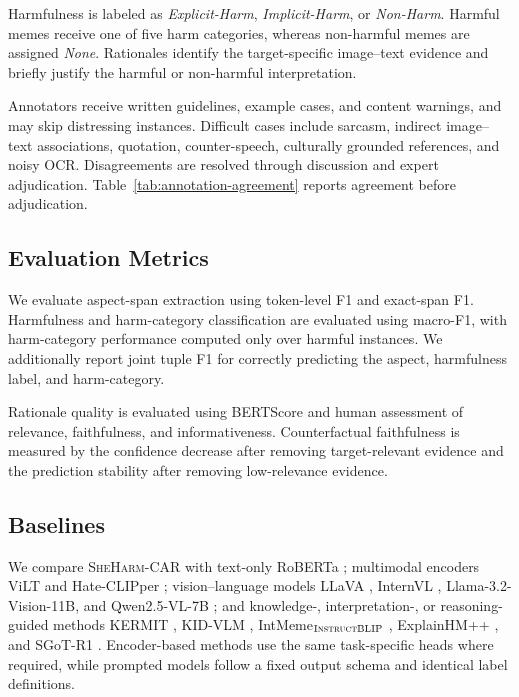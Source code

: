 \documentclass[11pt]{article}
\begin{document}
Harmfulness is labeled as \textit{Explicit-Harm},
\textit{Implicit-Harm}, or \textit{Non-Harm}. Harmful memes receive
one of five harm categories, whereas non-harmful memes are assigned
\textit{None}. Rationales identify the target-specific image--text
evidence and briefly justify the harmful or non-harmful
interpretation.

Annotators receive written guidelines, example cases, and content
warnings, and may skip distressing instances. Difficult cases include
sarcasm, indirect image--text associations, quotation,
counter-speech, culturally grounded references, and noisy OCR.
Disagreements are resolved through discussion and expert adjudication.
Table~\ref{tab:annotation-agreement} reports agreement before
adjudication.

\subsection{Evaluation Metrics}
\label{subsec:metrics}

We evaluate aspect-span extraction using token-level F1 and exact-span
F1. Harmfulness and harm-category classification are evaluated using
macro-F1, with harm-category performance computed only over harmful
instances. We additionally report joint tuple F1 for correctly
predicting the aspect, harmfulness label, and harm-category.

Rationale quality is evaluated using BERTScore
\citep{zhang2020bertscore} and human assessment of relevance,
faithfulness, and informativeness. Counterfactual faithfulness is
measured by the confidence decrease after removing target-relevant
evidence and the prediction stability after removing low-relevance
evidence.
\subsection{Baselines}
\label{subsec:baselines}

We compare \textsc{SheHarm-CAR} with text-only RoBERTa
\citep{liu2019roberta}; multimodal encoders ViLT
\citep{kim2021vilt} and Hate-CLIPper
\citep{kumar2022hate}; vision--language models LLaVA
\citep{liu2023llava}, InternVL \citep{chen2024internvl},
Llama-3.2-Vision-11B, and Qwen2.5-VL-7B
\citep{qwen2025vl}; and knowledge-, interpretation-, or
reasoning-guided methods KERMIT \citep{grasso2024kermit},
KID-VLM \citep{garg2025just},
IntMeme$_{\textsc{InstructBLIP}}$
\citep{hee2025demystifying},
ExplainHM++ \citep{lin2025explainhm++}, and SGoT-R1
\citep{wang2026sgotr1}. Encoder-based methods use the same
task-specific heads where required, while prompted models follow a
fixed output schema and identical label definitions.
\end{document}

